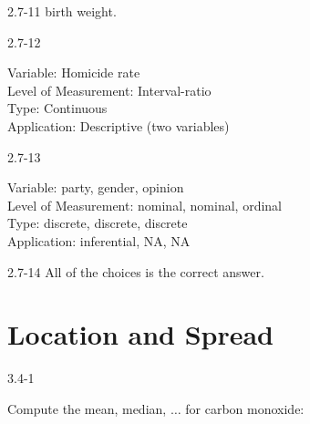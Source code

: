 \begin{exsol@solution}{2.7-11}
    birth weight.
\end{exsol@solution}
\begin{exsol@solution}{2.7-12}

    Variable: Homicide rate \\
    Level of Measurement: Interval-ratio \\
    Type: Continuous \\
    Application: Descriptive (two variables)

\end{exsol@solution}
\begin{exsol@solution}{2.7-13}

    Variable: party, gender, opinion \\
    Level of Measurement: nominal, nominal, ordinal \\
    Type: discrete, discrete, discrete \\
    Application: inferential, NA, NA

\end{exsol@solution}
\begin{exsol@solution}{2.7-14}
    All of the choices is the correct answer.
\end{exsol@solution}
\setcounter{chapter}{3}\chapter{Location and Spread}
\begin{exsol@solution}{3.4-1}

	Compute the mean, median, $\dots$ for carbon monoxide:
\end{exsol@solution}

